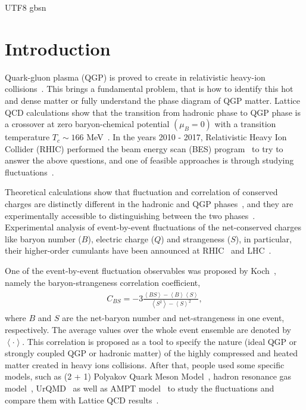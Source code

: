 \documentclass[twocolumn,showpacs,preprintnumbers,amsmath,amssymb]{revtex4-1}
\begin{document}
\begin{CJK*} {UTF8} {gbsn}
	\section{Introduction}
	\par
	Quark-gluon plasma (QGP) is proved to create in relativistic heavy-ion collisions~\cite{phase_e1,phase_e2,phase_e3,phase_e4}. 
	This brings a fundamental problem, that is how to identify this hot and dense matter or fully understand the phase diagram of QGP matter.
	Lattice QCD calculations show that the transition from hadronic phase to QGP phase is a crossover at zero baryon-chemical potential $(\mu_{B}=0)$ 
	with a transition temperature $T_{c}\sim166$ MeV~\cite{tc_1,tc_2}.
	In the years 2010 - 2017, Relativistic Heavy Ion Collider (RHIC) performed the beam energy scan (BES) program~\cite{bes_1,bes_2,bes_3}
to try to answer the above questions, and one of feasible approaches is through studying fluctuations~\cite{koch_re,jeon2003eventbyevent}.
	
	\par
	Theoretical calculations show that fluctuation and correlation of conserved charges are distinctly different in the hadronic and QGP phases~\cite{LuoNST}, 
	and they are experimentally accessible to distinguishing between the two phases~\cite{Adare_2016}.
	Experimental analysis of event-by-event fluctuations of the net-conserved charges like baryon number ($B$), electric charge ($Q$) and strangeness ($S$), in particular, their higher-order cumulants  have been announced at RHIC~\cite{exp_1,exp_2} and LHC~\cite{exp_3,exp_4}.
	
	
	One of the event-by-event fluctuation observables was proposed by Koch~\cite{Koch_origin}, namely the baryon-strangeness correlation coefficient, 
	\begin{eqnarray}%
	\begin{aligned}
	 C_{BS} = -3\frac{\left\langle BS \right\rangle - \left\langle B \right\rangle \left\langle S \right\rangle}{\left\langle S^{2}  \right\rangle - \left\langle S \right\rangle^{2}},
	 \end{aligned}
	\end{eqnarray}%
	where $B$ and $S$ are the net-baryon number and net-strangeness in one event, respectively.
	The average values over the whole event ensemble are denoted by $\left\langle \cdot \right\rangle$.
	This correlation is proposed as a tool to specify the nature (ideal QGP or strongly coupled QGP or hadronic matter) of the highly compressed and heated matter created in heavy ions collisions.
	After that, people used some specific models, such as (2 + 1) Polyakov Quark Meson Model~\cite{u_model1}, 
	hadron resonance gas model~\cite{u_model2,u_model3}, UrQMD~\cite{u_model4,Haussler_2007,Luo_UrQMD} as well as AMPT model~\cite{Jin_2008}
	 to study the fluctuations and compare them with Lattice QCD results~\cite{lattice_1,lattice_2}.
	

\end{CJK*}
\end{document}
